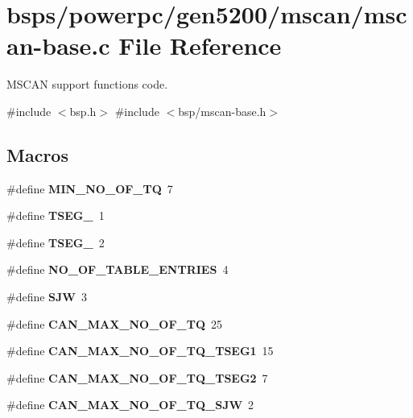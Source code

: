 \hypertarget{mscan-base_8c}{}\section{bsps/powerpc/gen5200/mscan/mscan-\/base.c File Reference}
\label{mscan-base_8c}


M\+S\+C\+AN support functions code.  


{\ttfamily \#include $<$bsp.\+h$>$}\newline
{\ttfamily \#include $<$bsp/mscan-\/base.\+h$>$}\newline
\subsection*{Macros}
\begin{DoxyCompactItemize}
\item 
\mbox{\label{mscan-base_8c_a2406482453127fda4a5c4d658bd89f63}} 
\#define {\bfseries M\+I\+N\+\_\+\+N\+O\+\_\+\+O\+F\+\_\+\+TQ}~7
\item 
\mbox{\label{mscan-base_8c_afe66f3385222f65a1fd7e5cb4b2a6e64}} 
\#define {\bfseries T\+S\+E\+G\+\_}~1
\item 
\mbox{\label{mscan-base_8c_aeafc6788a17f851b1716acadcf344eb8}} 
\#define {\bfseries T\+S\+E\+G\+\_}~2
\item 
\mbox{\label{mscan-base_8c_a4d853eeb4325b1b82e8fbf3c65aec07a}} 
\#define {\bfseries N\+O\+\_\+\+O\+F\+\_\+\+T\+A\+B\+L\+E\+\_\+\+E\+N\+T\+R\+I\+ES}~4
\item 
\mbox{\label{mscan-base_8c_a2d7ea218e18cf936afd6b11ea0478913}} 
\#define {\bfseries S\+JW}~3
\item 
\mbox{\label{mscan-base_8c_afafde830ced6be4dfbc4f9c8794e628e}} 
\#define {\bfseries C\+A\+N\+\_\+\+M\+A\+X\+\_\+\+N\+O\+\_\+\+O\+F\+\_\+\+TQ}~25
\item 
\mbox{\label{mscan-base_8c_aa2d9f048ea54c2cf2ad406d20d049912}} 
\#define {\bfseries C\+A\+N\+\_\+\+M\+A\+X\+\_\+\+N\+O\+\_\+\+O\+F\+\_\+\+T\+Q\+\_\+\+T\+S\+E\+G1}~15
\item 
\mbox{\label{mscan-base_8c_a75dd32eda45eeb1e765a9b4799225b44}} 
\#define {\bfseries C\+A\+N\+\_\+\+M\+A\+X\+\_\+\+N\+O\+\_\+\+O\+F\+\_\+\+T\+Q\+\_\+\+T\+S\+E\+G2}~7
\item 
\mbox{\label{mscan-base_8c_a2edca4e815f6d1d2ac7ce925609b48b0}} 
\#define {\bfseries C\+A\+N\+\_\+\+M\+A\+X\+\_\+\+N\+O\+\_\+\+O\+F\+\_\+\+T\+Q\+\_\+\+S\+JW}~2
\end{DoxyCompactItemize}

